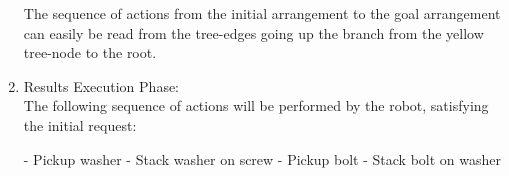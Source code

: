 \begin{enumerate}
The sequence of actions from the initial arrangement to the goal arrangement can easily be read from the tree-edges going up the branch from the yellow tree-node to the root.
	
	\item Results Execution Phase: \\
The following sequence of actions will be performed by the robot, satisfying the initial request:
\begin{python}
	- Pickup washer
	- Stack washer on screw
	- Pickup bolt
	- Stack bolt on washer
\end{python}
\end{enumerate}